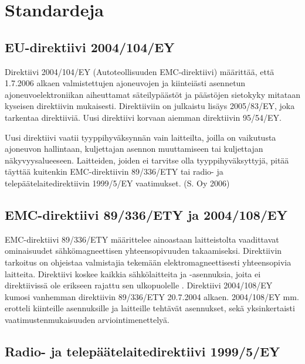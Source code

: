 \documentclass[11pt,a4paper,oneside,article]{memoir}
\begin{document}
\section{Standardeja}

\subsection{EU-direktiivi 2004/104/EY}

Direktiivi 2004/104/EY (Autoteollisuuden EMC-direktiivi) määrittää, että
1.7.2006 alkaen valmistettujen ajoneuvojen ja kiinteiästi asennetun
ajoneuvoelektroniikan aiheuttamat säteilypäästöt ja päästöjen sietokyky
mitataan kyseisen direktiivin mukaisesti. Direktiiviin on julkaistu
lisäys 2005/83/EY, joka tarkentaa direktiiviä. Uusi direktiivi korvaan
aiemman direktiivin 95/54/EY.

Uusi direktiivi vaatii tyyppihyväksynnän vain laitteilta, joilla on
vaikutusta ajoneuvon hallintaan, kuljettajan asennon muuttamiseen tai
kuljettajan näkyvyysalueeseen. Laitteiden, joiden ei tarvitse olla
tyyppihyväksyttyjä, pitää täyttää kuitenkin EMC-direktiivin 89/336/ETY
tai radio- ja telepäätelaitedirektiivin 1999/5/EY vaatimukset. (S. Oy
2006) \cite{1999/5/EY} \cite{89/336/ETY}

\subsection{EMC-direktiivi 89/336/ETY ja
2004/108/EY}

EMC-direktiivi 89/336/ETY määrittelee ainoastaan laitteistolta
vaadittavat ominaisuudet sähkömagneettisen yhteensopivuuden
takaamiseksi. Direktiivin tarkoitus on ohjeistaa valmistajia tekemään
elektromagneettisesti yhteensopivia laitteita. Direktiivi koskee kaikkia
sähkölaitteita ja -asennuksia, joita ei direktiivissä ole erikseen
rajattu sen ulkopuolelle \cite{89/336/ETY}. Direktiivi 2004/108/EY
kumosi vanhemman direktiivin 89/336/ETY 20.7.2004 alkaen. 2004/108/EY
mm. erotteli kiinteille asennuksille ja laitteille tehtävät asennukset,
sekä yksinkertaisti vaatimustenmukaisuuden arviointimenettelyä.
\cite{2004/108/EY}

\subsection{Radio- ja telepäätelaitedirektiivi
1999/5/EY}
\end{document}

